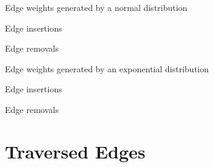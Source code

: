 \begin{table}[H]
\centering\footnotesize
{}
\label{tab:dyn-mwm:affected-hyp}

\begin{subtable}[t]{\textwidth}
\centering
\caption{Edge weights generated by a normal distribution}
\begin{minipage}[t]{.5\textwidth}
\centering
Edge insertions


\end{minipage}\hfill
\begin{minipage}[t]{.5\textwidth}
\centering
Edge removals


\end{minipage}
\end{subtable}\bigskip

\begin{subtable}[t]{\textwidth}
\centering
\caption{Edge weights generated by an exponential distribution}
\begin{minipage}[t]{.5\textwidth}
\centering
Edge insertions


\end{minipage}\hfill
\begin{minipage}[t]{.5\textwidth}
\centering
Edge removals


\end{minipage}
\end{subtable}
\end{table}

\pagebreak

\section{Traversed Edges}
\label{apx:dyn-mwm:vis-edges}

